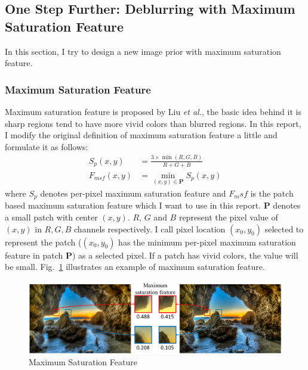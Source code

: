 \documentclass[journal, onecolumn, 10pt]{IEEEtran}
\begin{document}
\subsection{One Step Further: Deblurring with Maximum Saturation Feature}
In this section, I try to design a new image prior with maximum saturation feature\cite{liu2008image}. 
\subsubsection{Maximum Saturation Feature}
\label{sec:msf}
Maximum saturation feature is proposed by Liu \emph{et al.}, the basic idea behind it is sharp regions tend to have more vivid colors than blurred regions. In this report, I modify the original definition of maximum saturation feature a little and formulate it as follows:
\begin{equation}
\begin{split}
S_p(x, y) &= \frac{3 \times \min(R, G, B)}{R + G + B} \\
F_{msf}(x, y) &= \min_{(x, y) \in \mathbf{P}} S_p(x, y)
\end{split}
\end{equation}
where $S_p$ denotes per-pixel maximum saturation feature and $F_msf$ is the patch based maximum saturation feature which I want to use in this report. $\mathbf{P}$ denotes a small patch with center $(x, y)$. $R$, $G$ and $B$ represent the pixel value of $(x, y)$ in $R, G, B$ channels respectively. 
I call pixel location $(x_0, y_0)$ selected to represent the patch ($(x_0, y_0)$ has the minimum per-pixel maximum saturation feature in patch $\mathbf{P}$) as a selected pixel.
If a patch has vivid colors, the value will be small. Fig.~\ref{fig:maximum_saturation_feature} illustrates an example of maximum saturation feature.


\begin{figure}[h!]
\centering
\includegraphics[width = 1\textwidth]{pic/max_sat_feature.png}
\hspace{\fill}
\caption{Maximum Saturation Feature}
\label{fig:maximum_saturation_feature}
\end{figure}
\end{document}
